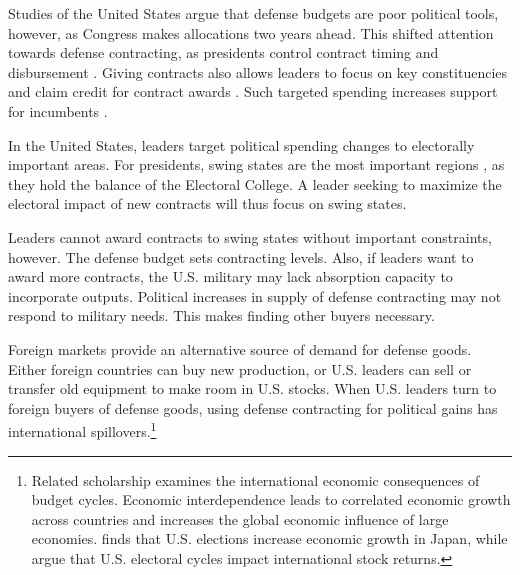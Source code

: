 \documentclass[12pt]{article}
\begin{document}
Studies of the United States argue that defense budgets are poor political tools, however, as Congress makes allocations two years ahead.
This shifted attention towards defense contracting, as presidents control contract timing and disbursement \citep{Mayer1995, DerouenHeo2000}.
Giving contracts also allows leaders to focus on key constituencies and claim credit for contract awards \citep{DerouenHeo2000}. 
Such targeted spending increases support for incumbents \citep{KrinerReeves2012}.


In the United States, leaders target political spending changes to electorally important areas.
For presidents, swing states are the most important regions \citep{KrinerReeves2015}, as they hold the balance of the Electoral College. 
A leader seeking to maximize the electoral impact of new contracts will thus focus on swing states.




Leaders cannot award contracts to swing states without important constraints, however. 
The defense budget sets contracting levels. 
Also, if leaders want to award more contracts, the U.S. military may lack absorption capacity to incorporate outputs.
Political increases in supply of defense contracting may not respond to military needs.
This makes finding other buyers necessary.


Foreign markets provide an alternative source of demand for defense goods.
Either foreign countries can buy new production, or U.S. leaders can sell or transfer old equipment to make room in U.S. stocks. 
When U.S. leaders turn to foreign buyers of defense goods, using defense contracting for political gains has international spillovers.\footnote{%
Related scholarship examines the international economic consequences of budget cycles.
Economic interdependence leads to correlated economic growth across countries \citep{Kayser2006} and increases the global economic influence of large economies. 
\citet{Ito1991} finds that U.S. elections increase economic growth in Japan, while \citet{FoersterSchmitz1997} argue that U.S. electoral cycles impact international stock returns.
}
\end{document}
